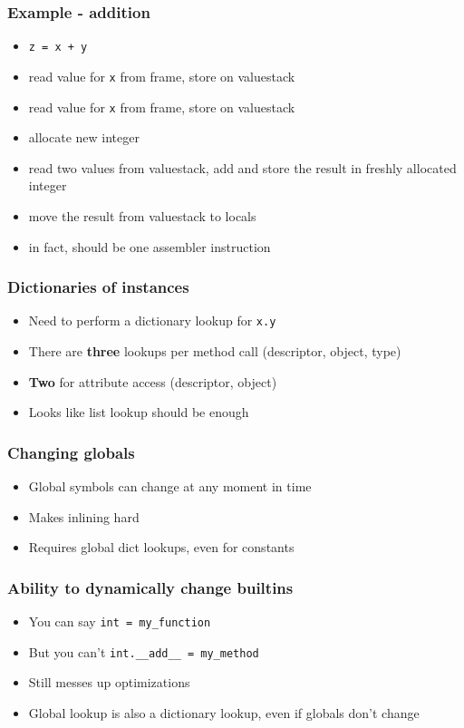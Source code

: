 \documentclass[utf8x]{beamer}
\begin{document}
\begin{frame}
  \frametitle{Example - addition}
  \begin{itemize}
    \item {\tt z = x + y}
    \item read value for {\tt x} from frame, store on valuestack
    \item read value for {\tt x} from frame, store on valuestack
    \item allocate new integer
    \item read two values from valuestack, add and store the result in
      freshly allocated integer
    \item move the result from valuestack to locals
      \pause
    \item {\color{red} in fact, should be one assembler instruction}
  \end{itemize}
\end{frame}

\begin{frame}
  \frametitle{Dictionaries of instances}
  \begin{itemize}
    \item Need to perform a dictionary lookup for {\tt x.y}
    \item There are {\bf three} lookups per method call
      (descriptor, object, type)
    \item {\bf Two} for attribute access
      (descriptor, object)
    \item Looks like list lookup should be enough
  \end{itemize}
\end{frame}

\begin{frame}
  \frametitle{Changing globals}
  \begin{itemize}
    \item Global symbols can change at any moment in time
    \item Makes inlining hard
    \item Requires global dict lookups, even for constants
  \end{itemize}
\end{frame}

\begin{frame}
  \frametitle{Ability to dynamically change builtins}
  \begin{itemize}
    \item You can say {\tt int = my\_function}
    \item But you can't {\tt int.\_\_add\_\_ = my\_method}
    \item Still messes up optimizations
    \item Global lookup is also a dictionary lookup, even if globals
      don't change
  \end{itemize}
\end{frame}
\end{document}
